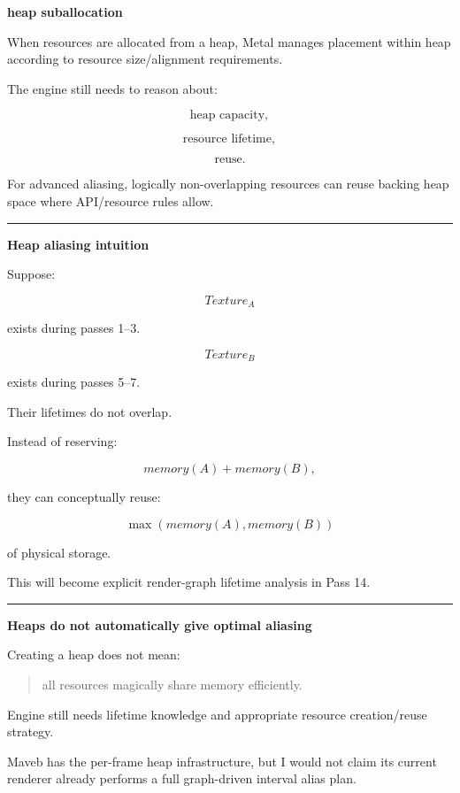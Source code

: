 \textbf{heap suballocation}

When resources are allocated from a heap, Metal manages placement within heap according to resource size/alignment requirements.

The engine still needs to reason about:

\[
\text{heap capacity},
\]

\[
\text{resource lifetime},
\]

\[
\text{reuse}.
\]

For advanced aliasing, logically non-overlapping resources can reuse backing heap space where API/resource rules allow.

\begin{center}\rule{0.5\linewidth}{0.5pt}\end{center}

\textbf{Heap aliasing intuition}

Suppose:

\[
Texture_A
\]

exists during passes 1--3.

\[
Texture_B
\]

exists during passes 5--7.

Their lifetimes do not overlap.

Instead of reserving:

\[
memory(A)+memory(B),
\]

they can conceptually reuse:

\[
\max(memory(A),memory(B))
\]

of physical storage.

This will become explicit render-graph lifetime analysis in Pass 14.

\begin{center}\rule{0.5\linewidth}{0.5pt}\end{center}

\textbf{Heaps do not automatically give optimal aliasing}

Creating a heap does not mean:

\begin{quote}
all resources magically share memory efficiently.
\end{quote}

Engine still needs lifetime knowledge and appropriate resource creation/reuse strategy.

Maveb has the per-frame heap infrastructure, but I would not claim its current renderer already performs a full graph-driven interval alias plan.

